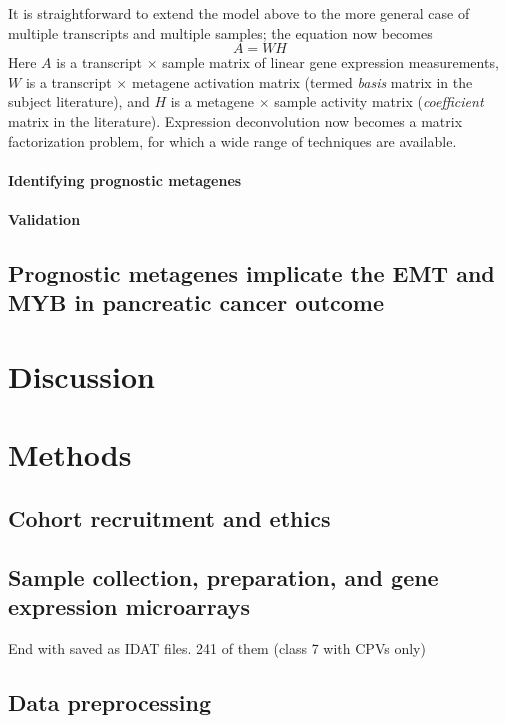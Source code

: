 \documentclass[dissertation.tex]{subfiles}
\begin{document}
It is straightforward to extend the model above to the more general case of multiple transcripts and multiple samples; the equation now becomes
\begin{equation}
  A = W H
\end{equation}
Here $A$ is a transcript $\times$ sample matrix of linear gene expression measurements, $W$ is a transcript $\times$ metagene activation matrix (termed \emph{basis} matrix in the subject literature), and $H$ is a metagene $\times$ sample activity matrix (\emph{coefficient} matrix in the literature).  Expression deconvolution now becomes a matrix factorization problem, for which a wide range of techniques are available.



\paragraph{Identifying prognostic metagenes}
\paragraph{Validation}
\subsection{Prognostic metagenes implicate the \acrshort{EMT} and MYB in pancreatic cancer outcome}

\section{Discussion}

\section{Methods}
\subsection{Cohort recruitment and ethics}

\subsection{Sample collection, preparation, and gene expression microarrays}
\mpfatal{}
End with saved as \gls{IDAT} files.  241 of them (class 7 with CPVs only)

\subsection{Data preprocessing}
\end{document}
